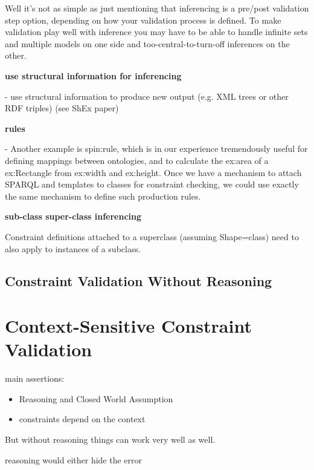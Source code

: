 \documentclass{llncs}
\begin{document}
Well it's not as simple as just mentioning that inferencing is a pre/post 
validation step option, depending on how your validation process is defined. 
To make validation play well with inference you may have to be able to handle 
infinite sets and multiple models on one side and too-central-to-turn-off 
inferences on the other.


\textbf{use structural information for inferencing}

- use structural information to produce new output (e.g. XML trees or other RDF triples) (see ShEx paper) 

\textbf{rules}

- Another example is spin:rule, which is in our experience 
tremendously useful for defining mappings between ontologies, and to
calculate the ex:area of a ex:Rectangle from ex:width and ex:height.
Once we have a mechanism to attach SPARQL and templates to classes for
constraint checking, we could use exactly the same mechanism to define
such production rules.


\textbf{sub-class super-class inferencing}

Constraint definitions attached to a superclass (assuming
Shape=class) need to also apply to instances of a subclass.

\subsection{Constraint Validation Without Reasoning}



\section{Context-Sensitive Constraint Validation}

main assertions:
\begin{itemize}
	\item Reasoning and Closed World Assumption
	\item constraints depend on the context
\end{itemize}

But without reasoning things can work very well as well. 

reasoning would either hide the error
\end{document}
